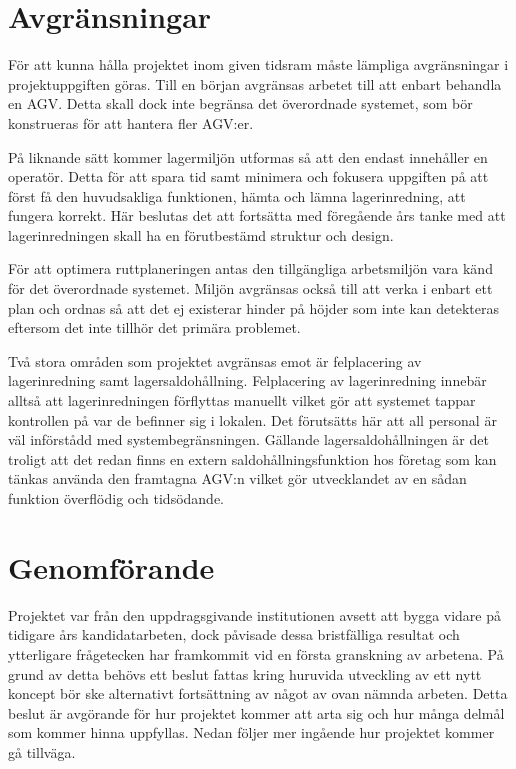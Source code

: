 \documentclass[a4paper,11pt]{article}
\begin{document}
\section{Avgränsningar}
För att kunna hålla projektet inom given tidsram måste lämpliga
avgränsningar i projektuppgiften göras. Till en början avgränsas arbetet
till att enbart behandla en AGV. Detta skall dock inte begränsa det
överordnade systemet, som bör konstrueras för att hantera fler AGV:er. 

På liknande sätt kommer lagermiljön utformas så att den endast innehåller
en operatör. Detta för att spara tid samt minimera och fokusera uppgiften
på att först få den huvudsakliga funktionen, hämta och lämna
lagerinredning, att fungera korrekt. Här beslutas det att fortsätta med
föregående års tanke med att lagerinredningen skall ha en förutbestämd
struktur och design.

För att optimera ruttplaneringen antas den tillgängliga arbetsmiljön vara
känd för det överordnade systemet. Miljön avgränsas också till att verka i
enbart ett plan och ordnas så att det ej existerar hinder på höjder som
inte kan detekteras eftersom det inte tillhör det primära problemet.

Två stora områden som projektet avgränsas emot är felplacering av
lagerinredning samt lagersaldohållning. Felplacering av lagerinredning
innebär alltså att lagerinredningen förflyttas manuellt vilket gör att
systemet tappar kontrollen på var de befinner sig i lokalen. Det förutsätts
här att all personal är väl införstådd med systembegränsningen. Gällande
lagersaldohållningen är det troligt att det redan finns en extern
saldohållningsfunktion hos företag som kan tänkas använda den framtagna
AGV:n vilket gör utvecklandet av en sådan funktion överflödig och
tidsödande.



\section{Genomförande}
Projektet var från den uppdragsgivande institutionen avsett att bygga
vidare på tidigare års kandidatarbeten, dock påvisade dessa bristfälliga
resultat och ytterligare frågetecken har framkommit vid en första
granskning av arbetena\cite{laser,qr}. På grund av detta behövs ett beslut
fattas kring huruvida utveckling av ett nytt koncept bör ske alternativt
fortsättning av något av ovan nämnda arbeten. Detta beslut är avgörande för
hur projektet kommer att arta sig och hur många delmål som kommer hinna
uppfyllas. Nedan följer mer ingående hur projektet kommer gå tillväga.
\end{document}
